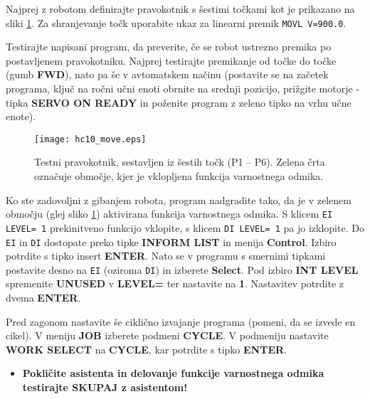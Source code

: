 Najprej z robotom definirajte pravokotnik s šestimi točkami kot je prikazano na sliki \ref{fig:hc10_move}. Za shranjevanje točk uporabite ukaz za linearni premik \verb"MOVL V=900.0".

Testirajte napisani program, da preverite, če se robot ustrezno premika po postavljenem pravokotniku. Najprej testirajte premikanje od točke do točke (gumb \textbf{FWD}), nato pa še v avtomatskem načinu (postavite se na začetek programa, ključ na ročni učni enoti obrnite na srednji pozicijo, prižgite motorje - tipka \textbf{SERVO ON READY} in poženite program z zeleno tipko na vrhu učne enote).

\begin{figure}[!hbt]
	\centering
	\texttt{[image: hc10\_move.eps]}
	\caption{Testni pravokotnik, sestavljen iz šestih točk (P1 -- P6). Zelena črta označuje območje, kjer je vklopljena funkcija varnostnega odmika. }
	\label{fig:hc10_move}
\end{figure}

Ko ste zadovoljni z gibanjem robota, program nadgradite tako, da je v zelenem območju (glej sliko \ref{fig:hc10_move}) aktivirana funkcija varnostnega odmika. S klicem \verb"EI LEVEL= 1" prekinitveno funkcijo vklopite, s klicem \verb"DI LEVEL= 1" pa jo izklopite. Do \verb"EI" in \verb"DI" dostopate preko tipke \textbf{INFORM LIST} in menija \textbf{Control}. Izbiro potrdite s tipko insert \textbf{ENTER}. Nato se v programu s smernimi tipkami postavite desno na \verb"EI" (oziroma \verb"DI") in izberete \textbf{Select}. Pod izbiro \textbf{INT LEVEL} spremenite \textbf{UNUSED} v \textbf{LEVEL=} ter nastavite na \textbf{1}. Nastavitev potrdite z dvema \textbf{ENTER}.

Pred zagonom nastavite še ciklično izvajanje programa (pomeni, da se izvede en cikel). V meniju \textbf{JOB} izberete podmeni \textbf{CYCLE}. V podmeniju nastavite \textbf{WORK SELECT} na \textbf{CYCLE}, kar potrdite s tipko \textbf{ENTER}.

\vspace{5mm}

\begin{mdframed}[backgroundcolor=red!20, shadow=true,roundcorner=8pt]
	\begin{itemize}
		\item \textbf{Pokličite asistenta in delovanje funkcije varnostnega odmika testirajte SKUPAJ z asistentom!}		
	\end{itemize}
\end{mdframed}


